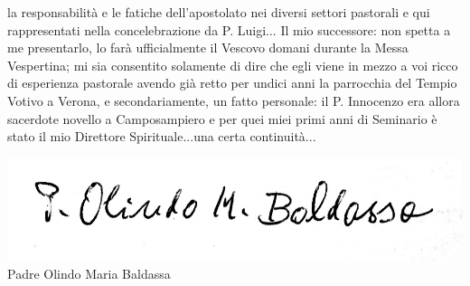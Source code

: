 la responsabilità e le fatiche dell'apostolato nei diversi settori pastorali e qui rappresentati nella concelebrazione da P. Luigi... 
Il mio successore: non spetta a me presentarlo, lo farà ufficialmente il Vescovo domani durante la Messa Vespertina; mi sia consentito solamente di dire che egli viene in mezzo a voi ricco di
esperienza pastorale avendo già retto per undici anni la parrocchia del Tempio Votivo a Verona, e secondariamente, un fatto personale: il P. Innocenzo era allora sacerdote novello a 
Camposampiero e per quei miei primi anni di Seminario è stato il mio Direttore Spirituale...una certa continuità...
\begin{flushright}
\includegraphics[scale=0.16]{immagini/firmaBaldassa.jpg}\\
Padre Olindo Maria Baldassa
\end{flushright}
